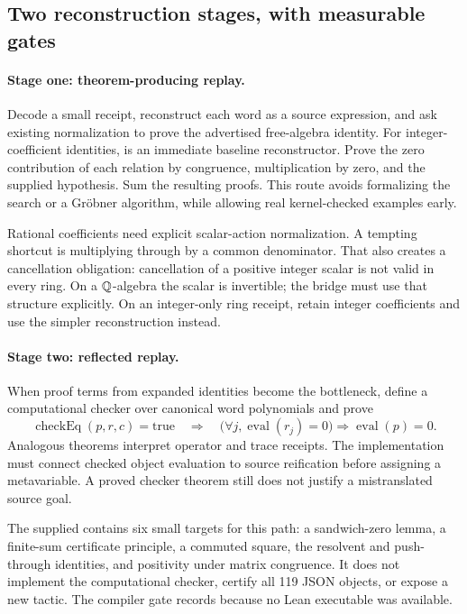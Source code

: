 \subsection{Two reconstruction stages, with measurable gates}

\paragraph{Stage one: theorem-producing replay.}
Decode a small receipt, reconstruct each word as a source expression, and ask
existing normalization to prove the advertised free-algebra identity. For
integer-coefficient identities,  is an immediate baseline
reconstructor. Prove the zero contribution of each relation by congruence,
multiplication by zero, and the supplied hypothesis. Sum the resulting
proofs. This route avoids formalizing the search or a Gr\"obner algorithm, while
allowing real kernel-checked examples early.

Rational coefficients need explicit scalar-action normalization. A tempting
shortcut is multiplying through by a common denominator. That also creates a
cancellation obligation: cancellation of a positive integer scalar is not valid
in every ring. On a $\mathbb Q$-algebra the scalar is invertible; the bridge must use
that structure explicitly. On an integer-only ring receipt, retain integer
coefficients and use the simpler reconstruction instead.

\paragraph{Stage two: reflected replay.}
When proof terms from expanded identities become the bottleneck, define a
computational checker over canonical word polynomials and prove
\[
 \operatorname{checkEq}(p,r,c)=\mathrm{true}
 \quad\Longrightarrow\quad
 \bigl(\forall j,\operatorname{eval}(r_j)=0\bigr)
 \Rightarrow\operatorname{eval}(p)=0.
\]
Analogous theorems interpret operator and trace receipts. The implementation
must connect checked object evaluation to source reification before assigning a
metavariable. A proved checker theorem still does not justify a mistranslated
source goal.

The supplied  contains six small targets
for this path: a sandwich-zero lemma, a finite-sum certificate principle, a
commuted square, the resolvent and push-through identities, and positivity under
matrix congruence. It does not implement the computational checker, certify all
119 JSON objects, or expose a new tactic. The compiler gate records
 because no Lean executable was available.


